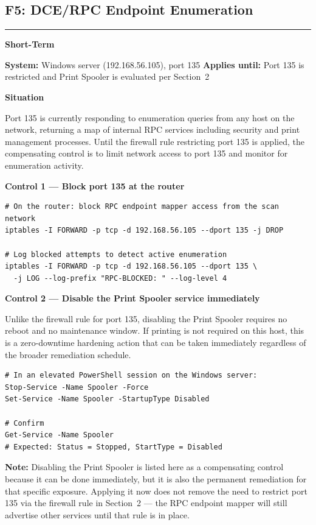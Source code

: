 \documentclass[12pt]{article}
\newcommand{\tfbadge}[2]{%
  \colorbox{#1}{\color{white}\textbf{\small #2}}%
}
\newcommand{\sectionrule}{%
  \vspace{4pt}\noindent\textcolor{headercol}{\rule{\linewidth}{0.8pt}}\vspace{4pt}%
}
\begin{document}
\subsection{F5: DCE/RPC Endpoint Enumeration}
\sectionrule
 
\noindent\tfbadge{shortcol}{Short-Term}
\quad\textbf{System:} Windows server (192.168.56.105), port 135
\quad\textbf{Applies until:} Port 135 is restricted and Print Spooler is
evaluated per Section~2
 
\bigskip
\noindent\textbf{Situation}
 
Port 135 is currently responding to enumeration queries from any host on the
network, returning a map of internal RPC services including security and print
management processes. Until the firewall rule restricting port 135 is applied,
the compensating control is to limit network access to port 135 and monitor
for enumeration activity.
 
\bigskip
\noindent\textbf{Control 1 --- Block port 135 at the router}
 
\begin{lstlisting}[style=terminal]
# On the router: block RPC endpoint mapper access from the scan network
iptables -I FORWARD -p tcp -d 192.168.56.105 --dport 135 -j DROP
 
# Log blocked attempts to detect active enumeration
iptables -I FORWARD -p tcp -d 192.168.56.105 --dport 135 \
  -j LOG --log-prefix "RPC-BLOCKED: " --log-level 4
\end{lstlisting}
 
\bigskip
\noindent\textbf{Control 2 --- Disable the Print Spooler service immediately}
 
Unlike the firewall rule for port 135, disabling the Print Spooler requires
no reboot and no maintenance window. If printing is not required on this
host, this is a zero-downtime hardening action that can be taken immediately
regardless of the broader remediation schedule.
 
\begin{lstlisting}[style=terminal]
# In an elevated PowerShell session on the Windows server:
Stop-Service -Name Spooler -Force
Set-Service -Name Spooler -StartupType Disabled
 
# Confirm
Get-Service -Name Spooler
# Expected: Status = Stopped, StartType = Disabled
\end{lstlisting}
 
\begin{notebox}
\textbf{Note:} Disabling the Print Spooler is listed here as a compensating
control because it can be done immediately, but it is also the permanent
remediation for that specific exposure. Applying it now does not remove the
need to restrict port 135 via the firewall rule in Section~2 --- the RPC
endpoint mapper will still advertise other services until that rule is in
place.
\end{notebox}
 
\end{document}
